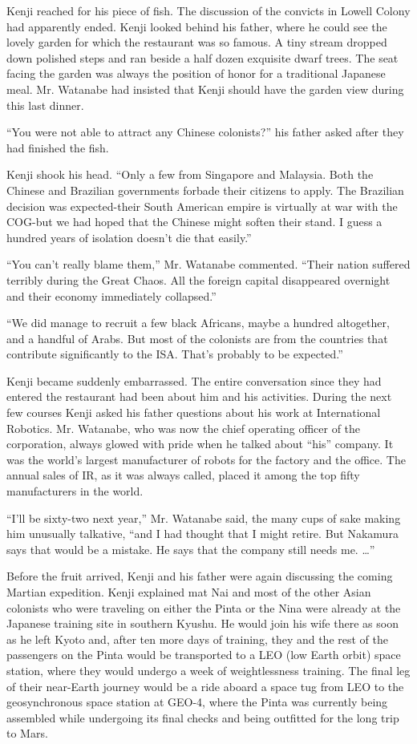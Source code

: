 \documentclass[]{article}
\begin{document}
{Kenji reached for his piece of fish.  The discussion of the convicts in Lowell Colony had apparently ended.  Kenji looked behind his father, where he could see the lovely garden for which the restaurant was so famous.  A tiny stream dropped down polished steps and ran beside a half dozen exquisite dwarf trees.  The seat facing the garden was always the position of honor for a traditional Japanese meal.  Mr.  Watanabe had insisted that Kenji should have the garden view during this last dinner.

“You were not able to attract any Chinese colonists?” his father asked after they had finished the fish.

Kenji shook his head.  “Only a few from Singapore and Malaysia.  Both the Chinese and Brazilian governments forbade their citizens to apply.  The Brazilian decision was expected-their South American empire is virtually at war with the COG-but we had hoped that the Chinese might soften their stand.  I guess a hundred years of isolation doesn’t die that easily.”

“You can’t really blame them,” Mr.  Watanabe commented.  “Their nation suffered terribly during the Great Chaos.  All the foreign capital disappeared overnight and their economy immediately collapsed.”

“We did manage to recruit a few black Africans, maybe a hundred altogether, and a handful of Arabs.  But most of the colonists are from the countries that contribute significantly to the ISA.  That’s probably to be expected.”

Kenji became suddenly embarrassed.  The entire conversation since they had entered the restaurant had been about him and his activities.  During the next few courses Kenji asked his father questions about his work at International Robotics.  Mr.  Watanabe, who was now the chief operating officer of the corporation, always glowed with pride when he talked about “his” company.  It was the world’s largest manufacturer of robots for the factory and the office.  The annual sales of IR, as it was always called, placed it among the top fifty manufacturers in the world.

“I’ll be sixty-two next year,” Mr.  Watanabe said, the many cups of sake making him unusually talkative, “and I had thought that I might retire.  But Nakamura says that would be a mistake.  He says that the company still needs me.  …”

Before the fruit arrived, Kenji and his father were again discussing the coming Martian expedition.  Kenji explained mat Nai and most of the other Asian colonists who were traveling on either the Pinta or the Nina were already at the Japanese training site in southern Kyushu.  He would join his wife there as soon as he left Kyoto and, after ten more days of training, they and the rest of the passengers on the Pinta would be transported to a LEO (low Earth orbit) space station, where they would undergo a week of weightlessness training.  The final leg of their near-Earth journey would be a ride aboard a space tug from LEO to the geosynchronous space station at GEO-4, where the Pinta was currently being assembled while undergoing its final checks and being outfitted for the long trip to Mars.

}
\end{document}
